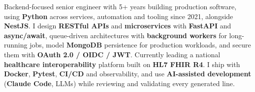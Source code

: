 
\begin{cvparagraph}
Backend-focused senior engineer with 5+ years building production software, using \textbf{Python} across services, automation and tooling since 2021, alongside \textbf{NestJS}. I design \textbf{RESTful APIs} and \textbf{microservices} with \textbf{FastAPI} and \textbf{async/await}, queue-driven architectures with \textbf{background workers} for long-running jobs, model \textbf{MongoDB} persistence for production workloads, and secure them with \textbf{OAuth 2.0 / OIDC / JWT}. Currently leading a national \textbf{healthcare interoperability} platform built on \textbf{HL7 FHIR R4}. I ship with \textbf{Docker}, \textbf{Pytest}, \textbf{CI/CD} and observability, and use \textbf{AI-assisted development} (\textbf{Claude Code}, LLMs) while reviewing and validating every generated line.
\end{cvparagraph}
